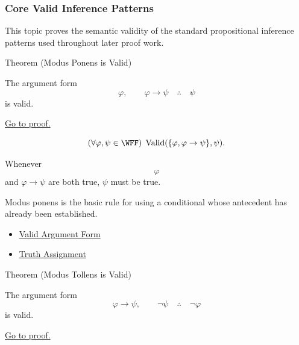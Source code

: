\subsubsection*{Core Valid Inference Patterns}

\begin{remark*}
This topic proves the semantic validity of the standard propositional inference
patterns used throughout later proof work.
\end{remark*}

\begin{theorembox}{Theorem (Modus Ponens is Valid)}
\begin{theorem}
\label{thm:modus-ponens-validity-propositional-logic}
The argument form
\[
\varphi,\qquad \varphi\to\psi \quad\therefore\quad \psi
\]
is valid.

\noindent\hyperref[prf:modus-ponens-validity-propositional-logic]{Go to proof.}
\end{theorem}
\end{theorembox}

\begin{remark*}
\[
(\forall\varphi,\psi\in\WFF)\;\operatorname{Valid}(\{\varphi,\varphi\to\psi\},\psi).
\]
\end{remark*}

\begin{remark*}
Whenever \[
  \varphi
\] and \(\varphi\to\psi\) are both true, \(\psi\) must be true.
\end{remark*}

\begin{remark*}[Interpretation]
Modus ponens is the basic rule for using a conditional whose antecedent has
already been established.
\end{remark*}

\begin{dependencies}
\begin{itemize}
  \item \hyperref[def:valid-argument-form-propositional-logic]{Valid Argument Form}
  \item \hyperref[def:truth-assignment-propositional-logic]{Truth Assignment}
\end{itemize}
\end{dependencies}

\begin{theorembox}{Theorem (Modus Tollens is Valid)}
\begin{theorem}
\label{thm:modus-tollens-validity-propositional-logic}
The argument form
\[
\varphi\to\psi,\qquad \neg\psi \quad\therefore\quad \neg\varphi
\]
is valid.

\noindent\hyperref[prf:modus-tollens-validity-propositional-logic]{Go to proof.}
\end{theorem}
\end{theorembox}

